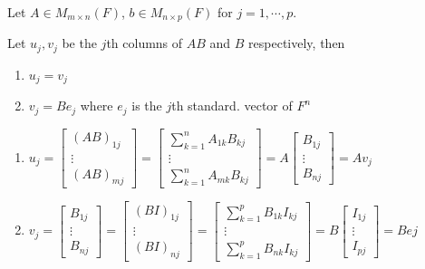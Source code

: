 Let $A \in M_{m\times n}(F)$, $b \in M_{n\times p }(F)$ for $j = 1,\cdots , p$.

Let $u_j , v_j$ be the $j$th columns of $AB$ and $B$ respectively, then 
\begin{enumerate}
\item $u_j = v_j$
\item $v_j = Be_j$ where $e_j$ is the $j$th standard. vector of $F^{n}$  
\end{enumerate}

\begin{enumerate}
\item $u_j = \begin{bmatrix}
	(AB)_{1j} \\ \vdots \\(AB)_{mj}
\end{bmatrix} = \begin{bmatrix}
	\sum_{k=1}^n A_{1k}B_{kj} \\ \vdots \\\sum_{k=1}^n A_{mk}B_{kj} 
\end{bmatrix} = A\begin{bmatrix}
	B_{1j}\\ \vdots \\ B_{nj}
\end{bmatrix} = Av_{j}$

\item $v_j = \begin{bmatrix}
B_{1j} \\ \vdots \\ B_{nj}
\end{bmatrix} = \begin{bmatrix}
	(BI)_{1j} \\ \vdots \\ (BI)_{nj}
\end{bmatrix} = \begin{bmatrix}
	\sum_{k=1}^p B_{1k}I_{kj}\\ \vdots \\ \sum_{k=1}^{p}B_{nk}I_{kj}
\end{bmatrix} = B\begin{bmatrix}
	I_{1j}\\ \vdots\\ I_{pj}
\end{bmatrix} = Bej$
\end{enumerate}
